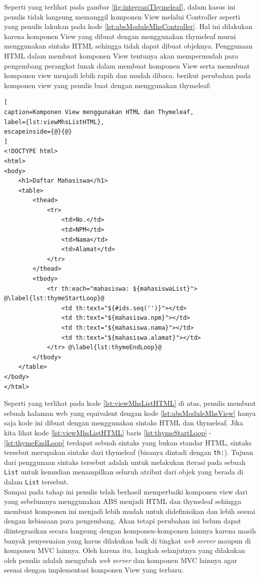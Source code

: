 Seperti yang terlihat pada gambar \ref{fig:integrasiThymeleaf}, dalam kasus ini penulis tidak langsung memanggil komponen View melalui Controller seperti yang penulis lakukan pada kode \ref{lst:absModuleMhsController}. Hal ini dilakukan karena komponen View yang dibuat dengan menggunakan thymeleaf murni menggunakan sintaks HTML sehingga tidak dapat dibuat objeknya. Penggunaan HTML dalam membuat komponen View tentunya akan mempermudah para pengembang perangkat lunak dalam membuat komponen View serta memubuat komponen view menjadi lebih rapih dan mudah dibaca. berikut perubahan pada komponen view yang penulis buat dengan menggunakan thymeleaf:

\begin{lstlisting}[
caption=Komponen View menggunakan HTML dan Thymeleaf,
label={lst:viewMhsListHTML},
escapeinside={@}{@}
]
<!DOCTYPE html>
<html>
<body>
	<h1>Daftar Mahasiswa</h1>
	<table>
		<thead>
			<tr>
				<td>No.</td>
				<td>NPM</td>
				<td>Nama</td>
				<td>Alamat</td>
			</tr>
		</thead>
		<tbody>
			<tr th:each="mahasiswa: ${mahasiswaList}"> @\label{lst:thymeStartLoop}@
				<td th:text="${#ids.seq('')}"></td>
				<td th:text="${mahasiswa.npm}"></td>
				<td th:text="${mahasiswa.nama}"></td>
				<td th:text="${mahasiswa.alamat}"></td>
			</tr> @\label{lst:thymeEndLoop}@
		</tbody>
	</table>
</body>
</html>
\end{lstlisting}

Seperti yang terlihat pada kode \ref{lst:viewMhsListHTML} di atas, penulis membuat sebuah halaman web yang equivalent dengan kode \ref{lst:absModuleMhsView} hanya saja kode ini dibuat dengan menggunakan sintaks HTML dan thymeleaf. Jika kita lihat kode \ref{lst:viewMhsListHTML} baris \ref{lst:thymeStartLoop} - \ref{lst:thymeEndLoop} terdapat sebuah sintaks yang bukan standar HTML, sintaks tersebut merupakan sintaks dari thymeleaf (bisanya dintadi dengan \texttt{th:}). Tujuan dari penggunaan sintaks tersebut adalah untuk melakukan iterasi pada sebuah \texttt{List} untuk kemudian menampilkan seluruh atribut dari objek yang berada di dalam \texttt{List} tersebut.\\

Sampai pada tahap ini penulis telah berhasil memperbaiki komponen view dari yang sebelumnya menggunakan ABS menjadi HTML dan thymeleaf sehingga membuat komponen ini menjadi lebih mudah untuk didefinisikan dan lebih sesuai dengan kebiasaan para pengembang. Akan tetapi perubahan ini belum dapat diintegrasikan secara langsung dengan komponen-komponen lainnya karena masih banyak penyesuaian yang harus dilakukan baik di tingkat \textit{web server} maupun di komponen MVC lainnya. Oleh karena itu, langkah selanjutnya yang dilakukan oleh penulis adalah mengubah \textit{web server} dan komponen MVC lainnya agar sesuai dengan implementasi komponen View yang terbaru.

